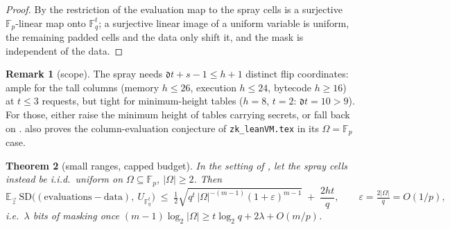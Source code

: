 \documentclass{article}
\newcommand{\Fp}{\mathbb{F}_p}
\newcommand{\Fq}{\mathbb{F}_q}
\newcommand{\extdeg}{\mathfrak{d}}
\newtheorem{theorem}{Theorem}[section]
\theoremstyle{definition}
\newtheorem{remark}[theorem]{Remark}
\begin{document}
\begin{proof}
By  the restriction of the evaluation map to the spray cells is a surjective $\Fp$-linear map onto $\Fq^t$; a surjective linear image of a uniform variable is uniform, the remaining padded cells and the data only shift it, and the mask is independent of the data.
\end{proof}

\begin{remark}[scope]\label{rem:fullrange-scope}
The spray needs $\extdeg t + s - 1 \leq h + 1$ distinct flip coordinates: ample for the tall columns (memory $h \leq 26$, execution $h \leq 24$, bytecode $h \geq 16$) at $t \leq 3$ requests, but tight for minimum-height tables ($h = 8$, $t = 2$: $\extdeg t = 10 > 9$). For those, either raise the minimum height of tables carrying secrets, or fall back on .  also proves the column-evaluation conjecture of \texttt{zk\_leanVM.tex} in its $\Omega = \Fp$ case.
\end{remark}

\begin{theorem}[small ranges, capped budget]\label{thm:smallomega}
In the setting of , let the spray cells instead be i.i.d.\ uniform on $\Omega \subseteq \Fp$, $|\Omega| \geq 2$. Then
\[
\mathbb{E}_{\vec z}\ \mathrm{SD}\big((\text{evaluations} - \text{data}),\ U_{\Fq^t}\big) \;\leq\; \tfrac12 \sqrt{ q^t\, |\Omega|^{-(m-1)} (1 + \varepsilon)^{m-1} } \;+\; \frac{2ht}{q} , \qquad \varepsilon = \tfrac{2|\Omega|}{q} = O(1/p) ,
\]
i.e.\ $\lambda$ bits of masking once $(m-1) \log_2 |\Omega| \geq t \log_2 q + 2\lambda + O(m/p)$.
\end{theorem}
\end{document}
